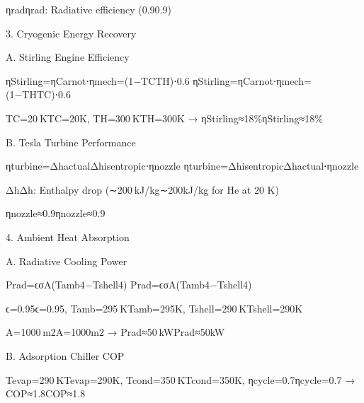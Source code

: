 \documentclass{article}
\begin{document}
ηradηrad\hspace{0pt}: Radiative efficiency (0.90.9)

3. Cryogenic Energy Recovery

A. Stirling Engine Efficiency

ηStirling=ηCarnot⋅ηmech=(1−TCTH)⋅0.6
ηStirling\hspace{0pt}=ηCarnot\hspace{0pt}⋅ηmech\hspace{0pt}=(1−TH\hspace{0pt}TC\hspace{0pt}\hspace{0pt})⋅0.6

TC=20 KTC\hspace{0pt}=20K, TH=300 KTH\hspace{0pt}=300K →
ηStirling≈18\%ηStirling\hspace{0pt}≈18\%

B. Tesla Turbine Performance

ηturbine=ΔhactualΔhisentropic⋅ηnozzle
ηturbine\hspace{0pt}=Δhisentropic\hspace{0pt}Δhactual\hspace{0pt}\hspace{0pt}⋅ηnozzle\hspace{0pt}

ΔhΔh: Enthalpy drop (∼200 kJ/kg∼200kJ/kg for He at 20 K)

ηnozzle≈0.9ηnozzle\hspace{0pt}≈0.9

4. Ambient Heat Absorption

A. Radiative Cooling Power

Prad=ϵσA(Tamb4−Tshell4)
Prad\hspace{0pt}=ϵσA(Tamb4\hspace{0pt}−Tshell4\hspace{0pt})

ϵ=0.95ϵ=0.95, Tamb=295 KTamb\hspace{0pt}=295K,
Tshell=290 KTshell\hspace{0pt}=290K

A=1000 m2A=1000m2 → Prad≈50 kWPrad\hspace{0pt}≈50kW

B. Adsorption Chiller COP

Tevap=290 KTevap\hspace{0pt}=290K, Tcond=350 KTcond\hspace{0pt}=350K,
ηcycle=0.7ηcycle\hspace{0pt}=0.7 → COP≈1.8COP≈1.8
\end{document}
